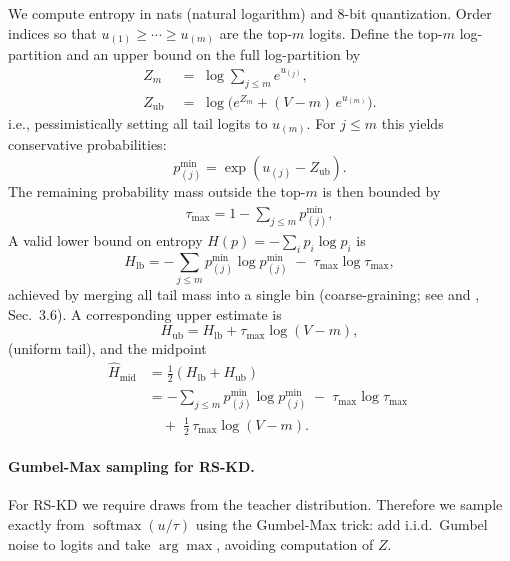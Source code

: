 \documentclass[11pt]{article}
\begin{document}
We compute entropy in nats (natural logarithm) and 8-bit quantization.
Order indices so that $u_{(1)} \geq \cdots \geq u_{(m)}$ are the top-$m$ logits.
Define the top-$m$ log-partition and an upper bound on the full log-partition by
\begin{align*}
	Z_m \;           & =\; \log \sum_{j \leq m} e^{u_{(j)}},           \\
	Z_{\text{ub}} \; & =\; \log\Big(e^{Z_m} + (V-m)\,e^{u_{(m)}}\Big).
\end{align*}
i.e., pessimistically setting all tail logits to $u_{(m)}$. For $j\le m$ this yields conservative probabilities:
\[
	p^{\min}_{(j)}=\exp(u_{(j)}-Z_{\text{ub}}).
\]
The remaining probability mass outside the top-$m$ is then bounded by
\begin{align*}
	\tau_{\max}=1-\sum_{j\le m}p^{\min}_{(j)},
\end{align*}
A valid lower bound on entropy $H(p)=-\sum_i p_i\log p_i$ is
\[
	H_{\text{lb}}=-\sum_{j\le m} p^{\min}_{(j)}\log p^{\min}_{(j)}\;-\;\tau_{\max}\log\tau_{\max},
\]
achieved by merging all tail mass into a single bin (coarse-graining; see \citep{cover2006elements} and \citep{kaltchenko2025entropyheatmap}, Sec.~3.6). A corresponding upper estimate is
\[
	H_{\text{ub}}=H_{\text{lb}}+\tau_{\max}\log(V-m),
\]
(uniform tail), and the midpoint
\begin{align*}
	\widehat{H}_{\text{mid}} & =\tfrac12\!\left(H_{\text{lb}}+H_{\text{ub}}\right)                                   \\
	                         & = -\sum_{j\le m}p^{\min}_{(j)}\log p^{\min}_{(j)} \;-\; \tau_{\max}\log\tau_{\max} \; \\
	                         & \quad +\; \tfrac12\,\tau_{\max}\log(V-m).
\end{align*}

\paragraph{Gumbel-Max sampling for RS-KD.}
For RS-KD we require draws from the teacher distribution.
Therefore we sample exactly from $\operatorname{softmax}(u/\tau)$ using the Gumbel-Max trick: add i.i.d.\ Gumbel noise to logits and take $\arg\max$, avoiding computation of $Z$.
\end{document}

